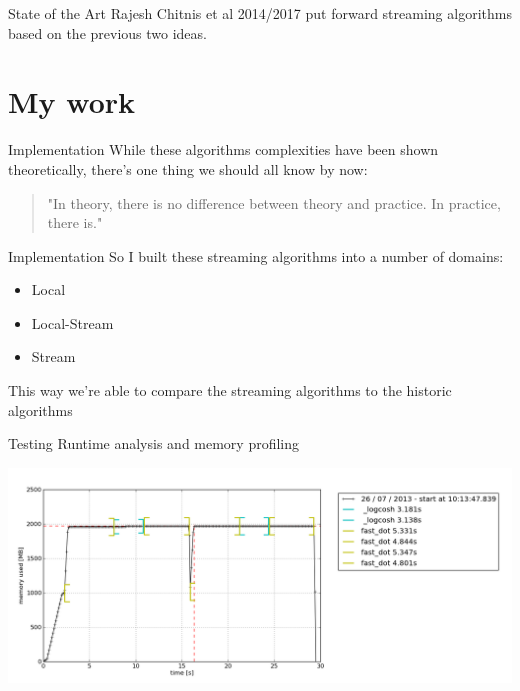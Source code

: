 \documentclass{beamer}
\begin{document}
\begin{frame}{State of the Art}
    Rajesh Chitnis et al 2014/2017 put forward streaming algorithms based on the previous two ideas.
\end{frame}

\section{My work}

\begin{frame}{Implementation}
    While these algorithms complexities have been shown theoretically, there's one thing we should all know by now:

    \hfill

    \begin{quote}
        "In theory, there is no difference between theory and practice. In practice, there is."
    \end{quote}
\end{frame}

\begin{frame}{Implementation}
    So I built these streaming algorithms into a number of domains:

    \begin{itemize}
        \item Local
        \item Local-Stream
        \item Stream
    \end{itemize}

    This way we're able to compare the streaming algorithms to the historic algorithms
\end{frame}

\begin{frame}{Testing}
    Runtime analysis and memory profiling

    \includegraphics[width=\textwidth]{memory-profiler}
\end{frame}
\end{document}
